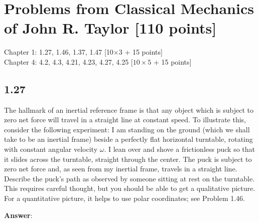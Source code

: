 \documentclass[11pt, a4paper]{article} %
\begin{document}
\newpage 
\section*{Problems from Classical Mechanics of John R. Taylor [110 points]} 
Chapter 1: 1.27, 1.46, 1.37, 1.47 [10$\times3$ + 15 points]\\
Chapter 4: 4.2, 4.3, 4.21, 4.23, 4.27, 4.25 [$10\times5$ + 15 points]\\

\newpage
\subsection*{1.27}
The hallmark of an inertial reference frame is that any object which is subject to zero net force will travel in a straight line at constant speed. To illustrate this, consider the following experiment: I am standing on the ground (which we shall take to be an inertial frame) beside a perfectly flat horizontal turntable, rotating with constant angular velocity $\omega$. I lean over and shove a frictionless puck so that it slides across the turntable, straight through the center. The puck is subject to zero net force and, as seen from my inertial frame, travels in a straight line. Describe the puck’s path as observed by someone sitting at rest on the turntable. This requires careful thought, but you should be able to get a qualitative picture. For a quantitative picture, it helps to use polar coordinates; see Problem 1.46.

\textbf{Answer}:
\end{document}
